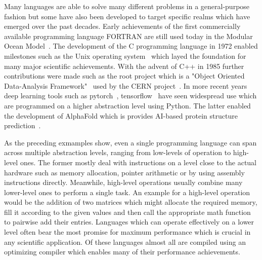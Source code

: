 \documentclass{article}
\begin{document}
Many languages are able to solve many different problems in a general-purpose fashion but some have
also been developed to target specific realms which have emerged over the past decades.
Early achievements of the first commercially available programming language FORTRAN are still used
today in the Modular Ocean Model~\cite{Adcroft2019,Griffies2012}.
The development of the C programming language in 1972 enabled milestones such as the Unix operating
system~ \cite{Ritchie1978} which layed the foundation for many major scientific achievements.
With the advent of C++ in 1985 further contributions were made such as the root project which
is a "Object Oriented Data-Analysis Framework"~\cite{Brun1997} used by the CERN
project~\cite{https://doi.org/10.7483/opendata.atlas.l806.5cku}.
In more recent years  deep learning tools such as pytorch~\cite{Ansel_PyTorch_2_Faster_2024},
tensorflow~\cite{tensorflow2015-whitepaper} have seen widespread use which are programmed on a
higher abstraction level using Python.
The latter enabled the development of AlphaFold which is provides AI-based protein structure
prediction~\cite{Jumper2021}.


As the preceding exmamples show, even a single programming language can span across multiple
abstraction levels, ranging from low-levels of operation to high-level ones.
The former mostly deal with instructions on a level close to the actual hardware such as memory
allocation, pointer arithmetic or by using assembly instructions directly.
Meanwhile, high-level operations usually combine many lower-level ones to perform a single task.
An example for a high-level operation would be the addition of two matrices which might allocate the
required memory, fill it according to the given values and then call the appropriate math function
to pairwise add their entries.
Languages which can operate effectively on a lower level often bear the most promise for maximum
performance which is crucial in any scientific application.
Of these languages almost all are compiled using an optimizing compiler which enables many of their
performance achievements.
\end{document}
